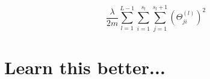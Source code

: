 \[
    \frac{\lambda}{2m}\sum_{l=1}^{L-1}\sum_{i=1}^{s_t}\sum_{j=1}^{s_l+1}(\Theta_{ji}^{(l)})^2
\]

\section{Learn this better...}



%
